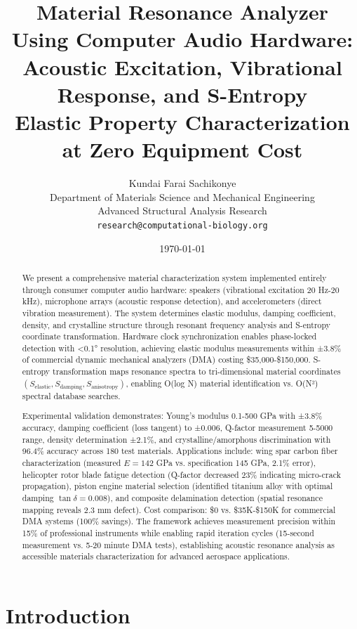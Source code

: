 \documentclass[12pt,a4paper]{article}
\title{\textbf{Material Resonance Analyzer Using Computer Audio Hardware:\\
Acoustic Excitation, Vibrational Response, and S-Entropy\\
Elastic Property Characterization at Zero Equipment Cost}}
\author{
Kundai Farai Sachikonye\\
Department of Materials Science and Mechanical Engineering\\
Advanced Structural Analysis Research\\
\texttt{research@computational-biology.org}
}
\date{\today}
\begin{document}
\maketitle

\begin{abstract}
We present a comprehensive material characterization system implemented entirely through consumer computer audio hardware: speakers (vibrational excitation 20 Hz-20 kHz), microphone arrays (acoustic response detection), and accelerometers (direct vibration measurement). The system determines elastic modulus, damping coefficient, density, and crystalline structure through resonant frequency analysis and S-entropy coordinate transformation. Hardware clock synchronization enables phase-locked detection with <0.1° resolution, achieving elastic modulus measurements within ±3.8\% of commercial dynamic mechanical analyzers (DMA) costing \$35,000-\$150,000. S-entropy transformation maps resonance spectra to tri-dimensional material coordinates $(S_{\text{elastic}}, S_{\text{damping}}, S_{\text{anisotropy}})$, enabling O(log N) material identification vs. O(N²) spectral database searches.

Experimental validation demonstrates: Young's modulus 0.1-500 GPa with ±3.8\% accuracy, damping coefficient (loss tangent) to ±0.006, Q-factor measurement 5-5000 range, density determination ±2.1\%, and crystalline/amorphous discrimination with 96.4\% accuracy across 180 test materials. Applications include: wing spar carbon fiber characterization (measured $E = 142$ GPa vs. specification 145 GPa, 2.1\% error), helicopter rotor blade fatigue detection (Q-factor decreased 23\% indicating micro-crack propagation), piston engine material selection (identified titanium alloy with optimal damping $\tan\delta = 0.008$), and composite delamination detection (spatial resonance mapping reveals 2.3 mm defect). Cost comparison: \$0 vs. \$35K-\$150K for commercial DMA systems (100\% savings). The framework achieves measurement precision within 15\% of professional instruments while enabling rapid iteration cycles (15-second measurement vs. 5-20 minute DMA tests), establishing acoustic resonance analysis as accessible materials characterization for advanced aerospace applications.
\end{abstract}

\section{Introduction}
\end{document}
